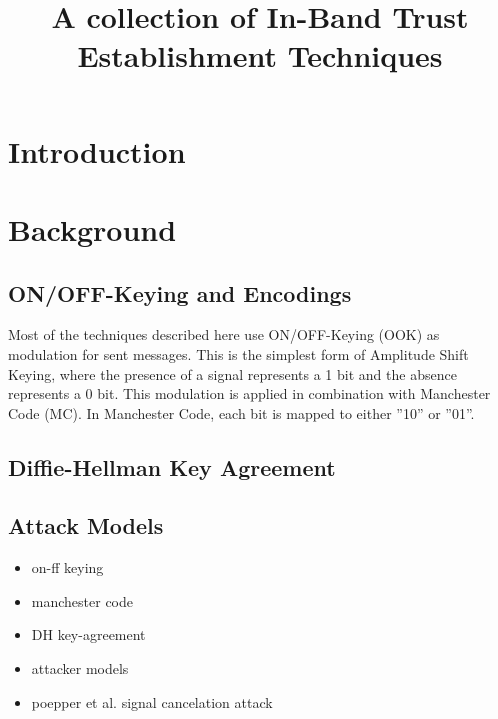 \documentclass[conference]{IEEEtran}
\begin{document}
\title{A collection of In-Band Trust Establishment Techniques\\
}

\author{
}

\maketitle

\begin{abstract}

\end{abstract}


\section{Introduction}

\section{Background}
\subsection{ON/OFF-Keying and Encodings}
Most of the techniques described here use ON/OFF-Keying (OOK) as modulation for sent messages. This is the simplest form of Amplitude Shift Keying, where the presence of a signal represents a 1 bit and the absence represents a 0 bit. This modulation is applied in combination with Manchester Code (MC). In Manchester Code, each bit is mapped to either ''10'' or ''01''.
\subsection{Diffie-Hellman Key Agreement}
\subsection{Attack Models}
\begin{itemize}
    \item on-ff keying
    \item manchester code 
    \item DH key-agreement
    \item attacker models
    \item poepper et al. signal cancelation attack
\end{itemize}
\end{document}
